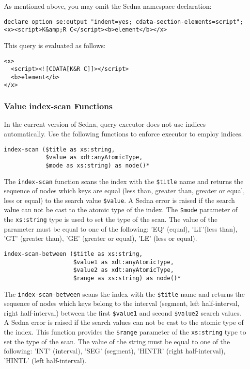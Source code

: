 \documentclass[a4paper,12pt]{article}
\begin{document}
As mentioned above, you may omit the Sedna namespace declaration:
\begin{verbatim}
declare option se:output "indent=yes; cdata-section-elements=script";
<x><script>K&amp;R C</script><b>element</b></x>
\end{verbatim}

This query is evaluated as follows:
\begin{verbatim}
<x>
  <script><![CDATA[K&R C]]></script>
  <b>element</b>
</x>
\end{verbatim}





\subsubsection{Value index-scan Functions}
\label{sec:value-index-scan-fun}

In the current version of Sedna, query executor does not use indices
automatically. Use the following functions to enforce executor to employ
indices.

\begin{verbatim}
index-scan ($title as xs:string,
            $value as xdt:anyAtomicType,
            $mode as xs:string) as node()*
\end{verbatim}

The \verb!index-scan! function scans the index with the \verb!$title! name and
returns the sequence of nodes which keys are equal (less than, greater than,
greater or equal, less or equal) to the search value \verb!$value!. A Sedna
error is raised if the search value can not be cast to the atomic type of the
index. The \verb!$mode! parameter of the \verb!xs:string! type is used to set
the type of the scan. The value of the parameter must be equal to one of the
following: 'EQ' (equal), 'LT'(less than), 'GT' (greater than), 'GE' (greater or
equal), 'LE' (less or equal).

\begin{verbatim}
index-scan-between ($title as xs:string,
                    $value1 as xdt:anyAtomicType,
                    $value2 as xdt:anyAtomicType,
                    $range as xs:string) as node()*
\end{verbatim}

The \verb!index-scan-between! scans the index with the \verb!$title! name and
returns the sequence of nodes which keys belong to the interval (segment, left
half-interval, right half-interval) between the first \verb!$value1! and second
\verb!$value2! search values. A Sedna error is raised if the search values can
not be cast to the atomic type of the index. This function provides the
\verb!$range! parameter of the \verb!xs:string! type to set the type of the
scan. The value of the string must be equal to one of the following: 'INT'
(interval), 'SEG' (segment), 'HINTR' (right half-interval), 'HINTL' (left
half-interval).
\end{document}
